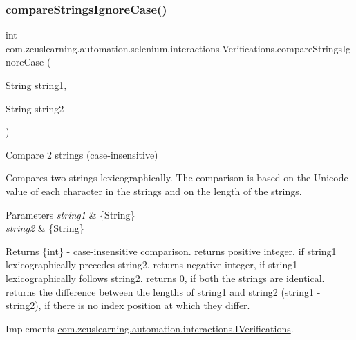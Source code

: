 \subsubsection{\texorpdfstring{compare\+Strings\+Ignore\+Case()}{compareStringsIgnoreCase()}}
{\footnotesize\ttfamily int com.\+zeuslearning.\+automation.\+selenium.\+interactions.\+Verifications.\+compare\+Strings\+Ignore\+Case (\begin{DoxyParamCaption}\item[{String}]{string1,  }\item[{String}]{string2 }\end{DoxyParamCaption})\hspace{0.3cm}{\ttfamily [inline]}}

Compare 2 strings (case-\/insensitive)

Compares two strings lexicographically. The comparison is based on the Unicode value of each character in the strings and on the length of the strings. 


\begin{DoxyParams}{Parameters}
{\em string1} & \{String\} \\
\hline
{\em string2} & \{String\} \\
\hline
\end{DoxyParams}
\begin{DoxyReturn}{Returns}
\{int\} -\/ case-\/insensitive comparison. returns positive integer, if {\ttfamily string1} lexicographically precedes {\ttfamily string2}. returns negative integer, if {\ttfamily string1} lexicographically follows {\ttfamily string2}. returns 0, if both the strings are identical. returns the difference between the lengths of {\ttfamily string1} and {\ttfamily string2} ({\ttfamily string1} -\/ {\ttfamily string2}), if there is no index position at which they differ. 
\end{DoxyReturn}


Implements \hyperlink{interfacecom_1_1zeuslearning_1_1automation_1_1interactions_1_1IVerifications_a8dbd85a25febbd6a7f5e3b1bf186e0f1}{com.\+zeuslearning.\+automation.\+interactions.\+I\+Verifications}.

\hypertarget{classcom_1_1zeuslearning_1_1automation_1_1selenium_1_1interactions_1_1Verifications_a5e29c5310810934f0e069203e35e31bc}{}\label{classcom_1_1zeuslearning_1_1automation_1_1selenium_1_1interactions_1_1Verifications_a5e29c5310810934f0e069203e35e31bc} 
